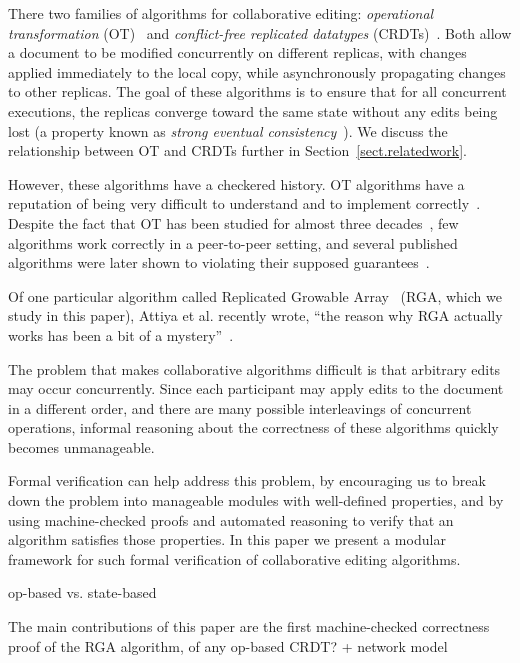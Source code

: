 \documentclass[11pt]{article}
\begin{document}
There two families of algorithms for collaborative editing: \emph{operational transformation}
(OT)~\cite{Ellis:1989ue,Ressel:1996wx,Oster:2006tr,Sun:1998vf,Sun:1998un,Suleiman:1998eu,Nichols:1995fd}
and \emph{conflict-free replicated datatypes}
(CRDTs)~\cite{Shapiro:2011wy,Roh:2011dw,Preguica:2009fz,Oster:2006wj,Weiss:2010hx,Nedelec:2013ky,Kleppmann:2016ve}.
Both allow a document to be modified concurrently on different replicas, with changes applied
immediately to the local copy, while asynchronously propagating changes to other replicas. The
goal of these algorithms is to ensure that for all concurrent executions, the replicas converge
toward the same state without any edits being lost (a property known as \emph{strong eventual
consistency}~\cite{Shapiro:2011un}). We discuss the relationship between OT and CRDTs further in
Section~\ref{sect.relatedwork}.

However, these algorithms have a checkered history. OT algorithms have a reputation of being very
difficult to understand and to implement correctly~\cite{Spiewak:2010vw}. Despite the fact that OT
has been studied for almost three decades~\cite{Ellis:1989ue}, few algorithms work correctly in a
peer-to-peer setting, and several published algorithms were later shown to violating their supposed
guarantees~\cite{Imine:2003ks,Imine:2006kn,Li:2004er,Randolph:2015gj}.

Of one particular algorithm called Replicated Growable Array~\cite{Roh:2011dw} (RGA, which we study
in this paper), Attiya et al. recently wrote, ``the reason why RGA actually works has been a bit of
a mystery''~\cite{Attiya:2016kh}.

The problem that makes collaborative algorithms difficult is that arbitrary edits may occur
concurrently. Since each participant may apply edits to the document in a different order, and there
are many possible interleavings of concurrent operations, informal reasoning about the correctness
of these algorithms quickly becomes unmanageable.

Formal verification can help address this problem, by encouraging us to break down the problem into
manageable modules with well-defined properties, and by using machine-checked proofs and automated
reasoning to verify that an algorithm satisfies those properties. In this paper we present a modular
framework for such formal verification of collaborative editing algorithms.

op-based vs. state-based

The main contributions of this paper are the first machine-checked correctness proof of the RGA
algorithm, of any op-based CRDT? + network model
\end{document}
